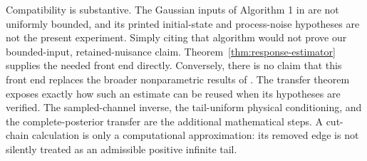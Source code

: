 Compatibility is substantive. The Gaussian inputs of Algorithm 1 in
\cite{SRD2020} are not uniformly bounded, and its printed initial-state and
process-noise hypotheses are not the present experiment. Simply citing that
algorithm would not prove our bounded-input, retained-nuisance claim.
Theorem~\ref{thm:response-estimator} supplies the needed front end directly.
Conversely, there is no claim that this front end replaces the broader
nonparametric results of \cite{Gold1998,SRD2020}. The transfer theorem exposes
exactly how such an estimate can be reused when its hypotheses are verified.
The sampled-channel inverse, the tail-uniform physical conditioning, and the
complete-posterior transfer are the additional mathematical steps. A cut-chain
calculation is only a computational approximation: its removed edge is not
silently treated as an admissible positive infinite tail.
